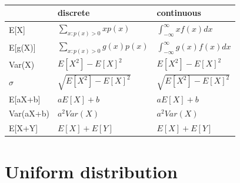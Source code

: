 \documentclass[slidestop,compress,mathserif]{beamer}
\begin{document}
\begin{frame}\frametitle{}
\begin{center}
\begin{tabular}{ |p{1.5in}| p{1.25in}| p{1.25in}|}%
\hline
\vspace{1mm}
&discrete & continuous  \\ \hline
\vspace{1mm}
E[X] & $\sum_{x:p(x)>0}xp(x)$ & $\int_{-\infty}^{\infty} xf(x)dx$ \\ \hline
\vspace{1mm}
E[g(X)] & $\sum_{x:p(x)>0}g(x)p(x)$ & $\int_{-\infty}^{\infty} g(x)f(x)dx$ \\ \hline
\vspace{1mm}
Var(X) & $E[X^2] - E[X]^2$ & $E[X^2] - E[X]^2$  \\ \hline
\vspace{1mm}
$\sigma$ & $\sqrt{E[X^2] - E[X]^2}$  & $\sqrt{E[X^2] - E[X]^2}$ \\ \hline
\vspace{1mm}
E[aX+b] & $aE[X] + b$ & $aE[X] + b$  \\ \hline
\vspace{1mm}
Var(aX+b) & $a^2Var(X)$ & $a^2Var(X)$  \\ \hline
\vspace{1mm}
E[X+Y] & $E[X] + E[Y]$ & $E[X] + E[Y]$  \\ \hline
\end{tabular}
\end{center}


\end{frame}


\section{Uniform distribution}
\end{document}
